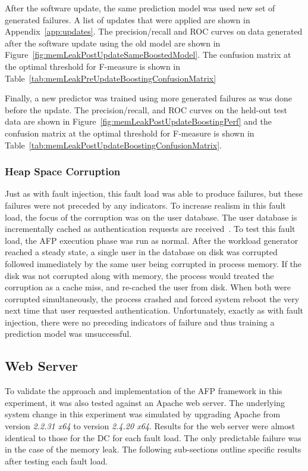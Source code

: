 After the software update, the same prediction model was used new set of
generated failures.  A list of updates that were applied are shown in
Appendix~\ref{app:updates}.  The precision/recall and \ac{ROC} curves on data
generated after the software update using the old model are shown in
Figure~\ref{fig:memLeakPostUpdateSameBoostedModel}.  The confusion matrix at
the optimal threshold for F-measure is shown in
Table~\ref{tab:memLeakPreUpdateBoostingConfusionMatrix}

\figMemLeakPostUpdateSameBoostedModel
\tabMemLeakPostUpdateBoostingSameModelConfusionMatrix

Finally, a new predictor was trained using more generated failures as was done
before the update.  The precision/recall, and \ac{ROC} curves on the held-out
test data are shown in Figure~\ref{fig:memLeakPostUpdateBoostingPerf} and the
confusion matrix at the optimal threshold for F-measure is shown in
Table~\ref{tab:memLeakPostUpdateBoostingConfusionMatrix}.

\figMemLeakPostUpdateBoostingPerf
\tabMemLeakPostUpdateBoostingConfusionMatrix

\subsubsection{Heap Space Corruption}
Just as with fault injection, this fault load was able to produce failures, but
these failures were not preceded by any indicators.  To increase realism in
this fault load, the focus of the corruption was on the user database.  The
user database is incrementally cached as authentication requests are
received~\cite{russinovich2009}.  To test this fault load, the \ac{AFP}
execution phase was run as normal.  After the workload generator reached a
steady state, a single user in the database on disk was corrupted followed
immediately by the same user being corrupted in process memory.  If the disk
was not corrupted along with memory, the process would treated the corruption
as a cache miss, and re-cached the user from disk.  When both were corrupted
simultaneously, the process crashed and forced system reboot the very next time
that user requested authentication.  Unfortunately, exactly as with fault
injection, there were no preceding indicators of failure and thus training a
prediction model was unsuccessful.

\subsection{Web Server}
To validate the approach and implementation of the \ac{AFP} framework in this
experiment, it was also tested against an Apache web server.  The underlying
system change in this experiment was simulated by upgrading Apache from version
\emph{2.2.31 x64} to version \emph{2.4.20 x64}.  Results for the web server
were almost identical to those for the \ac{DC} for each fault load.  The only
predictable failure was in the case of the memory leak.  The following
sub-sections outline specific results after testing each fault load.

